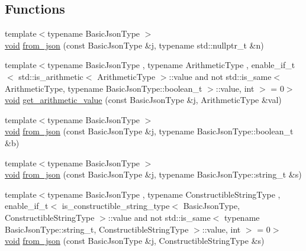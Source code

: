 \subsection*{Functions}
\begin{DoxyCompactItemize}
\item 
{\footnotesize template$<$typename Basic\+Json\+Type $>$ }\\\hyperlink{namespacenlohmann_1_1detail_a59fca69799f6b9e366710cb9043aa77d}{void} \hyperlink{namespacenlohmann_1_1detail_a1f0395aad0fe853a4539288749d3a603}{from\+\_\+json} (const Basic\+Json\+Type \&j, typename std\+::nullptr\+\_\+t \&n)
\item 
{\footnotesize template$<$typename Basic\+Json\+Type , typename Arithmetic\+Type , enable\+\_\+if\+\_\+t$<$ std\+::is\+\_\+arithmetic$<$ Arithmetic\+Type $>$\+::value and not std\+::is\+\_\+same$<$ Arithmetic\+Type, typename Basic\+Json\+Type\+::boolean\+\_\+t $>$\+::value, int $>$  = 0$>$ }\\\hyperlink{namespacenlohmann_1_1detail_a59fca69799f6b9e366710cb9043aa77d}{void} \hyperlink{namespacenlohmann_1_1detail_a85955b9c6dd31846e4b8e891f78614b6}{get\+\_\+arithmetic\+\_\+value} (const Basic\+Json\+Type \&j, Arithmetic\+Type \&val)
\item 
{\footnotesize template$<$typename Basic\+Json\+Type $>$ }\\\hyperlink{namespacenlohmann_1_1detail_a59fca69799f6b9e366710cb9043aa77d}{void} \hyperlink{namespacenlohmann_1_1detail_a58117f225f43d03e3a0a4a6f3d77c9d9}{from\+\_\+json} (const Basic\+Json\+Type \&j, typename Basic\+Json\+Type\+::boolean\+\_\+t \&b)
\item 
{\footnotesize template$<$typename Basic\+Json\+Type $>$ }\\\hyperlink{namespacenlohmann_1_1detail_a59fca69799f6b9e366710cb9043aa77d}{void} \hyperlink{namespacenlohmann_1_1detail_ad74d89f77ada7a57eff38b43d4bf2335}{from\+\_\+json} (const Basic\+Json\+Type \&j, typename Basic\+Json\+Type\+::string\+\_\+t \&s)
\item 
{\footnotesize template$<$typename Basic\+Json\+Type , typename Constructible\+String\+Type , enable\+\_\+if\+\_\+t$<$ is\+\_\+constructible\+\_\+string\+\_\+type$<$ Basic\+Json\+Type, Constructible\+String\+Type $>$\+::value and not std\+::is\+\_\+same$<$ typename Basic\+Json\+Type\+::string\+\_\+t, Constructible\+String\+Type $>$\+::value, int $>$  = 0$>$ }\\\hyperlink{namespacenlohmann_1_1detail_a59fca69799f6b9e366710cb9043aa77d}{void} \hyperlink{namespacenlohmann_1_1detail_a2932f2bc2943dac6d51669312f4fc0f5}{from\+\_\+json} (const Basic\+Json\+Type \&j, Constructible\+String\+Type \&s)

\end{DoxyCompactItemize}
